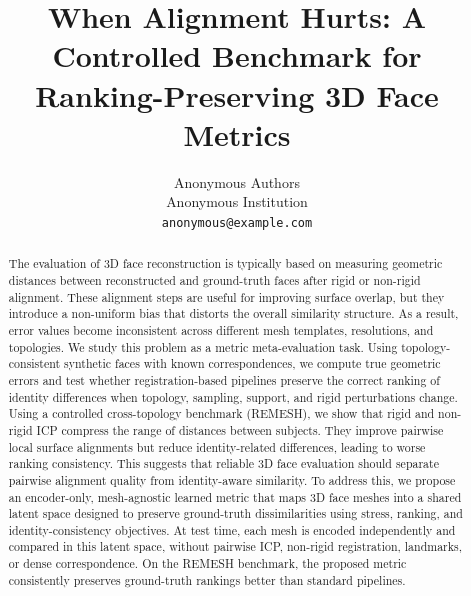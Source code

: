 \documentclass{article}
\title{When Alignment Hurts: A Controlled Benchmark for Ranking-Preserving 3D Face Metrics}
\author{%
  Anonymous Authors \\
  Anonymous Institution \\
  \texttt{anonymous@example.com}
}
\begin{document}
\maketitle

\begin{abstract}
The evaluation of 3D face reconstruction is typically based on measuring
geometric distances between reconstructed and ground-truth faces after rigid or
non-rigid alignment. These alignment steps are useful for improving surface overlap, but they introduce a non-uniform bias that distorts the overall similarity structure. As a result, error values become inconsistent across different mesh templates, resolutions, and topologies. We study this problem as a metric meta-evaluation task. Using topology-consistent synthetic faces with known correspondences, we compute true geometric errors and test whether registration-based pipelines preserve the correct ranking of identity differences when topology, sampling, support, and rigid perturbations change. Using a controlled cross-topology benchmark (REMESH), we show that rigid and non-rigid ICP compress the range of distances between subjects. They improve pairwise local surface alignments but reduce identity-related differences, leading to worse ranking consistency. This suggests that reliable 3D face evaluation should separate pairwise alignment quality from identity-aware similarity. To address this, we propose an encoder-only, mesh-agnostic learned metric that maps 3D face meshes into a shared latent space designed to preserve ground-truth dissimilarities using stress, ranking, and identity-consistency objectives. At test time, each mesh is encoded independently and compared in this latent space, without pairwise ICP, non-rigid registration, landmarks, or dense correspondence. On the REMESH benchmark, the proposed metric consistently preserves ground-truth rankings better than standard pipelines.




\end{abstract}
\end{document}
